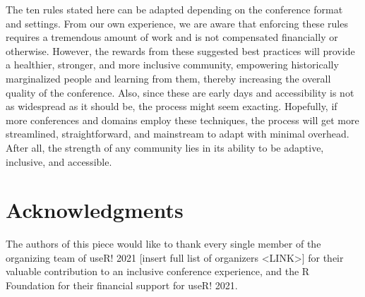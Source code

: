 \documentclass[10pt,letterpaper]{article}
\begin{document}
The ten rules stated here can be adapted depending on the conference format and settings. From our own experience, we are aware that enforcing these rules requires a tremendous amount of work and is not compensated financially or otherwise. However, the rewards from these suggested best practices will provide a healthier, stronger, and more inclusive community, empowering historically marginalized people and learning from them, thereby increasing the overall quality of the conference. Also, since these are early days and accessibility is not as widespread as it should be, the process might seem exacting. Hopefully, if more conferences and domains employ these techniques, the process will get more streamlined, straightforward, and mainstream to adapt with minimal overhead. After all, the strength of any community lies in its ability to be adaptive, inclusive, and accessible.


\section*{Acknowledgments}
The authors of this piece would like to thank every single member of the organizing team of useR! 2021 [insert full list of organizers <LINK>] for their valuable contribution to an inclusive conference experience, and the R Foundation for their financial support for useR! 2021. 








\end{document}
